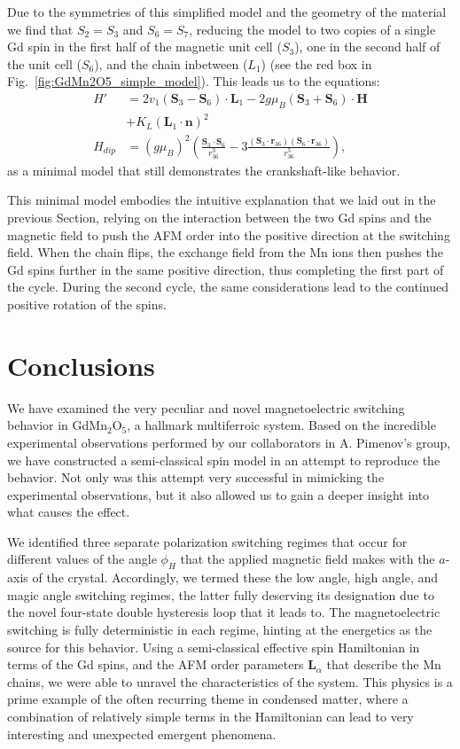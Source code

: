 Due to the symmetries of this simplified model and the geometry of the material we find that $S_2 = S_3$ and $S_6 = S_7$, reducing the model to two copies of a single Gd spin in the first half of the magnetic unit cell ($S_3$), one in the second half of the unit cell ($S_6$), and the chain inbetween ($L_1$) (see the red box in Fig.~\ref{fig:GdMn2O5_simple_model}).
This leads us to the equations:
\begin{align}
	H' &= 2v_1(\bm{S}_3 - \bm{S}_6)\cdot\bm{L}_1 - 2g \mu_B (\bm{S}_3 + \bm{S}_6) 
\cdot \bm{H} \\
	&+ K_L (\bm{L}_1 \cdot \bm{n})^2 \nonumber\\
	H_{dip} &= (g \mu_B)^2\left(\frac{\bm{S}_3\cdot \bm{S}_6}{r_{36}^3}-3\frac{(\bm{S}_3\cdot \bm{r}_{36})(\bm{S}_6\cdot \bm{r}_{36})}{r_{36}^5}\right)\nonumber,
\end{align}
as a minimal model that still demonstrates the crankshaft-like behavior.

This minimal model embodies the intuitive explanation that we laid out in the previous Section, relying on the interaction between the two Gd spins and the magnetic field to push the AFM order into the positive direction at the switching field.
When the chain flips, the exchange field from the Mn ions then pushes the Gd spins further in the same positive direction, thus completing the first part of the cycle.
During the second cycle, the same considerations lead to the continued positive rotation of the spins.



\section{Conclusions}
We have examined the very peculiar and novel magnetoelectric switching behavior in GdMn$_2$O$_5$, a hallmark multiferroic system.
Based on the incredible experimental observations performed by our collaborators in A. Pimenov's group, we have constructed a semi-classical spin model in an attempt to reproduce the behavior.
Not only was this attempt very successful in mimicking the experimental observations, but it also allowed us to gain a deeper insight into what causes the effect.

We identified three separate polarization switching regimes that occur for different values of the angle $\phi_H$ that the applied magnetic field makes with the $a$-axis of the crystal.
Accordingly, we termed these the low angle, high angle, and magic angle switching regimes, the latter fully deserving its designation due to the novel four-state double hysteresis loop that it leads to.
The magnetoelectric switching is fully deterministic in each regime, hinting at the energetics as the source for this behavior.
Using a semi-classical effective spin Hamiltonian in terms of the Gd spins, and the AFM order parameters $\bm L_\alpha$ that describe the Mn chains, we were able to unravel the characteristics of the system.
This physics is a prime example of the often recurring theme in condensed matter, where a combination of relatively simple terms in the Hamiltonian can lead to very interesting and unexpected emergent phenomena.

